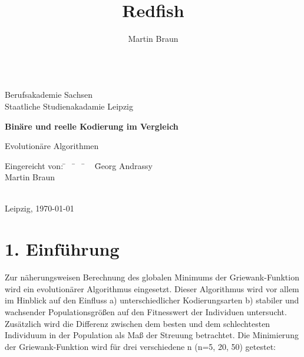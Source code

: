 \documentclass[12pt,
    a4paper,
    headinclude,
    footinclude]{scrreprt}
\author{Martin Braun}
\title{Redfish}
\begin{document}
	\onehalfspacing
	\monthyearsepgerman{\,}{\,}
	\setcounter{tocdepth}{2}
	

	
	\begin{titlepage}
	
		\begin{center}
			~\\[2cm]
			Berufsakademie Sachsen \\
			Staatliche Studienakadamie Leipzig \\[2.4cm]
           
			\begin{huge}
			    \textbf{Binäre und reelle Kodierung im Vergleich} \\[2.4cm]
			\end{huge}
			
			\doublespacing

			Evolutionäre Algorithmen 


		\end{center}
		
		\onehalfspacing
		\begin{tabbing}
			Eingereicht von: \= ~ \= ~ \= ~ \= Georg Andrassy \\
			\> \> \> \> Martin Braun \\
			\\

		\end{tabbing}
		\vspace*{\fill}
		Leipzig, \today
		
	\end{titlepage}
    
    \clearpage
        
    \setcounter{page}{2}
    
\section*{1. Einführung}	\onehalfspacing

Zur näherungsweisen Berechnung des globalen Minimums der Griewank-Funktion wird ein evolutionärer Algorithmus eingesetzt. Dieser Algorithmus wird vor allem im Hinblick auf den Einfluss  a) unterschiedlicher Kodierungsarten b) stabiler und wachsender Populationsgrößen auf den Fitnesswert der Individuen untersucht. Zusätzlich wird die Differenz zwischen dem besten und dem schlechtesten Individuum in der Population als Maß der Streuung betrachtet. Die Minimierung der Griewank-Funktion wird für drei verschiedene n (n=5, 20, 50) getestet:
\end{document}
